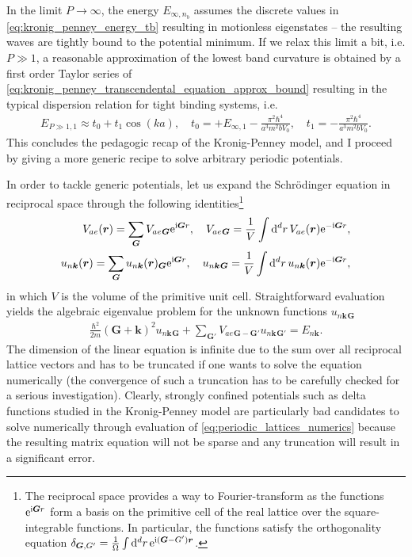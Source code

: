 In the limit $P\rightarrow\infty$, the energy $E_{\infty,n_b}$ assumes the discrete values in \cref{eq:kronig_penney_energy_tb} resulting in motionless eigenstates -- the resulting waves are tightly bound to the potential minimum.
If we relax this limit a bit, i.e. $P\gg 1$, a reasonable approximation of the lowest band curvature is obtained by a first order Taylor series of \cref{eq:kronig_penney_transcendental_equation_approx_bound} resulting in the typical dispersion relation for tight binding systems, i.e.
\begin{align}
    E_{P\gg1,1}\approx t_0 + t_1 \cos(k a),
    \quad
    t_0 = + E_{\infty,1} - \frac{\pi^2 \hbar^4}{a^3 m^2 b V_0},
    \quad
    t_1 = -\frac{\pi^2\hbar^4}{a^3 m^2 bV_0}.
    \label{eq:kronig_penney_tight_binding_dispersion}
\end{align}
This concludes the pedagogic recap of the Kronig-Penney model, and I proceed by giving a more generic recipe to solve arbitrary periodic potentials.

In order to tackle generic potentials, let us expand the Schrödinger equation in reciprocal space through the following identities\footnote{The reciprocal space provides a way to Fourier-transform as the functions $\mathrm e^{\mathrm i {\bm G r}}$ form a basis on the primitive cell of the real lattice over the square-integrable functions. In particular, the functions satisfy the orthogonality equation $\delta_{\bm G, G'}=\frac1{\Omega}\int\mathrm d^dr\,\mathrm e^{\mathrm i({\bm G-G'}){\bm r}}$.}
\begin{align}
    V_{ae}({\bm r}) = \sum_{\bm G}V_{ae}{}_{\bm G}\mathrm e^{\mathrm i {\bm G r}},
    \quad
    V_{ae}{}_{\bm G} = \frac1{V}\int\mathrm d^dr\,V_{ae}({\bm r})\mathrm e^{-\mathrm i {\bm G r}},
    \\
    u_{n{\bm k}}({\bm r}) = \sum_{\bm G}u_{n{\bm k}}({\bm r}){}_{\bm G}\mathrm e^{\mathrm i {\bm G r}},
    \quad
    u_{n{\bm k}}{}_{\bm G} = \frac1{V}\int\mathrm d^dr\,u_{n{\bm k}}({\bm r})\mathrm e^{-\mathrm i {\bm G r}},
\end{align}
in which $V$ is the volume of the primitive unit cell.
Straightforward evaluation yields the algebraic eigenvalue problem for the unknown functions $u_{n{\bm k}}{}_{\bm G}$
\begin{align}
    \frac{\hbar^2}{2m}({\bm G}+{\bm k})^2u_{n{\bm k}}{}_{\bm G}+\sum_{\bm G'}V_{ae}{}_{\bm G-\bm G'}u_{n{\bm k}}{}_{\bm G'} = E_{n{\bm k}}.
    \label{eq:periodic_lattices_numerics}
\end{align}
The dimension of the linear equation is infinite due to the sum over all reciprocal lattice vectors and has to be truncated if one wants to solve the equation numerically (the convergence of such a truncation has to be carefully checked for a serious investigation).
Clearly, strongly confined potentials such as delta functions studied in the Kronig-Penney model are particularly bad candidates to solve numerically through evaluation of \cref{eq:periodic_lattices_numerics} because the resulting matrix equation will not be sparse and any truncation will result in a significant error.
%
%
